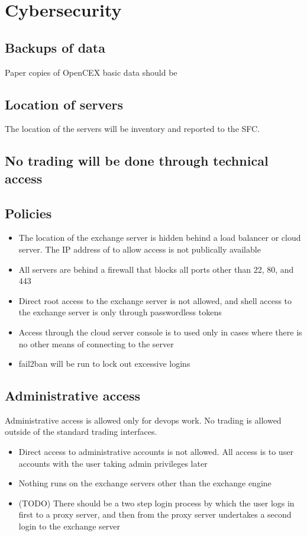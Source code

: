 \section{Cybersecurity}


\subsection{Backups of data}
Paper copies of OpenCEX basic data should be    

\subsection{Location of servers}
The location of the servers will be inventory and reported to the SFC.

\subsection{No trading will be done through technical access}

\subsection{Policies}
\begin{itemize}
  \item The location of the exchange server is hidden behind a load
  balancer or cloud server.  The IP address of to allow access is not
  publically available
  \item All servers are behind a firewall that blocks all ports other
    than 22, 80, and 443
  \item Direct root access to the exchange server is not allowed, and
    shell access to the exchange server is only through passwordless
    tokens
  \item Access through the cloud server console is to used only in
    cases where there is no other means of connecting to the server
  \item fail2ban will be run to lock out excessive logins 
\end{itemize}
\subsection{Administrative access}
Administrative access is allowed only for devops work.  No trading is
allowed outside of the standard trading interfaces.

\begin{itemize}
\item Direct access to administrative accounts is not allowed.  All
  access is to user accounts with the user taking admin privileges
  later
\item Nothing runs on the exchange servers other than the exchange engine
\item (TODO) There should be a two step login process by which the
  user logs in first to a proxy server, and then from the proxy server
  undertakes a second login to the exchange server
\end{itemize}

